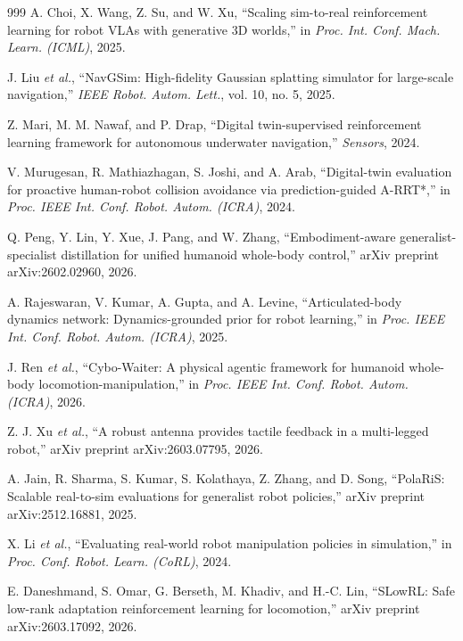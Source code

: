 \documentclass[12pt,a4paper,oneside]{report}
\begin{document}
\begin{thebibliography}{999}
A. Choi, X. Wang, Z. Su, and W. Xu, ``Scaling sim-to-real reinforcement learning for robot VLAs with generative 3D worlds,'' in \textit{Proc. Int. Conf. Mach. Learn. (ICML)}, 2025.

J. Liu \textit{et al.}, ``{NavGSim}: High-fidelity Gaussian splatting simulator for large-scale navigation,'' \textit{IEEE Robot. Autom. Lett.}, vol. 10, no. 5, 2025.

Z. Mari, M. M. Nawaf, and P. Drap, ``Digital twin-supervised reinforcement learning framework for autonomous underwater navigation,'' \textit{Sensors}, 2024.

V. Murugesan, R. Mathiazhagan, S. Joshi, and A. Arab, ``Digital-twin evaluation for proactive human-robot collision avoidance via prediction-guided A-RRT*,'' in \textit{Proc. IEEE Int. Conf. Robot. Autom. (ICRA)}, 2024.

Q. Peng, Y. Lin, Y. Xue, J. Pang, and W. Zhang, ``Embodiment-aware generalist-specialist distillation for unified humanoid whole-body control,'' arXiv preprint arXiv:2602.02960, 2026.

A. Rajeswaran, V. Kumar, A. Gupta, and A. Levine, ``Articulated-body dynamics network: Dynamics-grounded prior for robot learning,'' in \textit{Proc. IEEE Int. Conf. Robot. Autom. (ICRA)}, 2025.

J. Ren \textit{et al.}, ``Cybo-Waiter: A physical agentic framework for humanoid whole-body locomotion-manipulation,'' in \textit{Proc. IEEE Int. Conf. Robot. Autom. (ICRA)}, 2026.

Z. J. Xu \textit{et al.}, ``A robust antenna provides tactile feedback in a multi-legged robot,'' arXiv preprint arXiv:2603.07795, 2026.

A. Jain, R. Sharma, S. Kumar, S. Kolathaya, Z. Zhang, and D. Song, ``{PolaRiS}: Scalable real-to-sim evaluations for generalist robot policies,'' arXiv preprint arXiv:2512.16881, 2025.

X. Li \textit{et al.}, ``Evaluating real-world robot manipulation policies in simulation,'' in \textit{Proc. Conf. Robot. Learn. (CoRL)}, 2024.

E. Daneshmand, S. Omar, G. Berseth, M. Khadiv, and H.-C. Lin, ``{SLowRL}: Safe low-rank adaptation reinforcement learning for locomotion,'' arXiv preprint arXiv:2603.17092, 2026.


\end{thebibliography}
\end{document}

